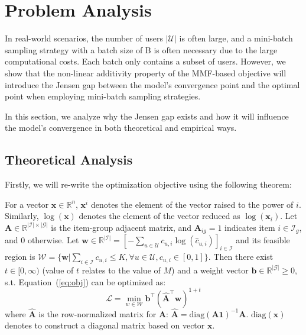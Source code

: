 \section{Problem Analysis}\label{sec:analsysis}
In real-world scenarios, the number of users $|\mathcal{U}|$ is often large, and a mini-batch sampling strategy with a batch size of B is often necessary due to the large computational costs. Each batch only contains a subset of users. However, we show that the non-linear additivity property of the MMF-based objective will introduce the Jensen gap between the model’s convergence point and the optimal point when employing mini-batch sampling strategies.

In this section, we analyze why the Jensen gap exists and how it will influence the model's convergence in both theoretical and empirical ways.


\subsection{Theoretical Analysis}

Firstly, we will re-write the optimization objective using the following theorem:
\begin{theorem}\label{theo:alpha_fair}
    For a vector $\bm{x}\in\mathbb{R}^n$, $\bm{x}^i$ denotes the element of the vector raised to the power of $i$. Similarly, $\log(\bm{x})$ denotes the element of the vector reduced as $\log(\bm{x}_i)$. 
    Let $\bm{A}\in\mathbb{R}^{|\mathcal{I}|\times|\mathcal{G}|}$ is the item-group adjacent matrix, and $\bm{A}_{ig} = 1$ indicates item $i\in \mathcal{I}_g$, and 0 otherwise. Let $\bm{w}\in\mathbb{R}^{|\mathcal{I}|} = [-\sum_{u\in\mathcal{U}}c_{u,i}\log(\hat{c}_{u,i})]_{i\in\mathcal{I}}$ and its feasible region is $\mathcal{W}=\{\bm{w}|\sum_{i\in\mathcal{I}} c_{u,i} \leq K, \forall u\in\mathcal{U}, c_{u,i}\in [0,1]\}$. Then there exist $t \in [0, \infty)$ (value of $t$ relates to the value of $M$) and a weight vector $\bm{b}\in\mathbb{R}^{|\mathcal{G}|}\ge 0$, s.t. Equation~(\ref{eq:obj}) can be optimized as:
    \begin{equation}\label{eq:t_fair}
      \mathcal{L} = \min_{w\in\mathcal{W}}   
       \bm{b}^{\top}(\hat{\bm{A}}^{\top}\bm{w})^{1+t}
    \end{equation}
    where $\hat{\bm{A}}$ is the row-normalized matrix for $\bm{A}$: $\hat{\bm{A}}=\text{diag}(\bm{A}\bm{1})^{-1}\bm{A}$. $\text{diag}(\bm{x})$ denotes to construct a diagonal matrix based on vector $\bm{x}$.
\end{theorem}


